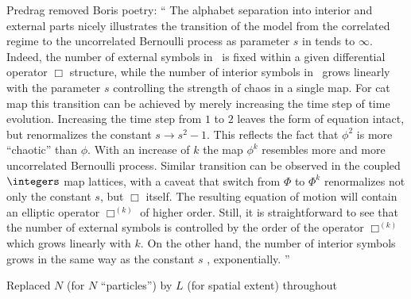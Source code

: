 \begin{description}
Predrag removed Boris poetry:
``
The  alphabet  separation into interior and external parts  nicely
illustrates  the  transition of the model from the correlated regime   to the
uncorrelated  Bernoulli process as parameter  $s$ in  tends
to $\infty$. Indeed, the number of external symbols in \Ae\ is fixed within a
given differential operator $\Box$  structure, while  the number of interior
symbols in \Ai\  grows linearly with the parameter $s$ controlling the
strength of chaos in a single map.   For {cat map} this transition can
be achieved by merely increasing the time step of time evolution. Increasing
the time step from $1$ to $2$ leaves the form of equation 
intact, but renormalizes the  constant  $s\to s^2-1$.  This reflects the fact
that $\phi^2$  is more ``chaotic'' than  $\phi$. With an increase of  $k$
the map $\phi^k$ resembles more and more uncorrelated   Bernoulli process.
Similar transition can be observed  in the coupled  $\integers$ map lattices,
with a caveat that switch   from $\Phi$ to  $\Phi^k$ renormalizes  not only
the constant $s$, but   $\Box$  itself. The resulting equation of motion will
contain an  elliptic operator $\Box^{(k)}$ of higher order. Still,  it is
straightforward  to see that   the number of external symbols  is controlled
by  the order of the  operator $\Box^{(k)}$ which  grows linearly with $k$.
On the other hand, the number of interior symbols grows in the same way as
the constant  $s$ \ie, exponentially.
''

Replaced $N$ (for $N$ ``particles'') by $L$ (for spatial
extent) throughout

\end{description}
